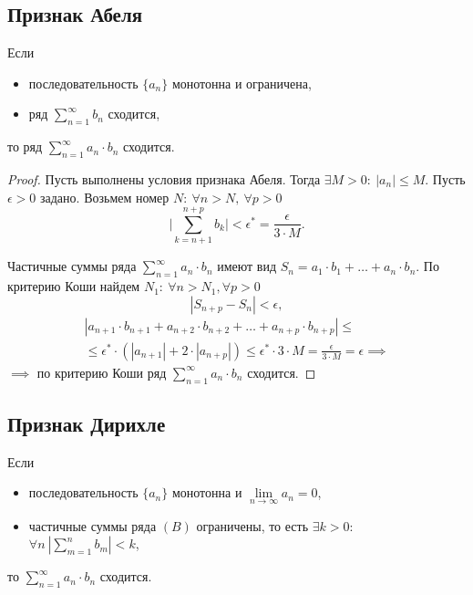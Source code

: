 \subsection{Признак Абеля}

\begin{theorem}
    Если \begin{itemize}
        \item последовательность $\{a_n\}$ монотонна и ограничена,
        \item ряд $\sum_{n=1}^{\infty} b_n$ сходится,
    \end{itemize}
    то ряд $\sum_{n=1}^{\infty}a_n \cdot b_n$ сходится.
\end{theorem}

\begin{proof}
    Пусть выполнены условия признака Абеля. Тогда $\exists M > 0: \ |a_n| \leqslant M$. Пусть $\epsilon > 0$ задано. Возьмем номер $N: \ \forall n > N, \ \forall p > 0$
    \[
        \bigg|\sum_{k=n+1}^{n+p}b_k\bigg| < \epsilon^* = \frac{\epsilon}{3\cdot M}.
    \]

    Частичные суммы ряда $\sum_{n=1}^{\infty}a_n\cdot b_n$ имеют вид $S_n = a_1\cdot b_1 + \ldots + a_n \cdot b_n$. По критерию Коши найдем $N_1: \ \forall n > N_1, \forall p > 0$
    \[
        |S_{n+p} - S_n| < \epsilon,
    \]
    \begin{multline*}
        |a_{n+1} \cdot b_{n+1} + a_{n+2} \cdot b_{n+2} + \ldots + a_{n+p} \cdot b_{n+p}| \leqslant \\
        \leqslant \epsilon^* \cdot (|a_{n+1}| + 2 \cdot |a_{n+p}|) \leqslant \epsilon^* \cdot 3 \cdot M = \frac{\epsilon}{3 \cdot M} = \epsilon \implies
    \end{multline*}
    $\implies$ по критерию Коши ряд $\sum_{n=1}^{\infty}a_n \cdot b_n$ сходится.
\end{proof}

\subsection{Признак Дирихле}

\begin{theorem}
    Если \begin{itemize}
        \item последовательность $\{a_n\}$ монотонна и $\underset{n\rightarrow\infty}{\lim}a_n = 0$,
        \item частичные суммы ряда $(B)$ ограничены, то есть $\exists k > 0: $ \\ $ \forall n \ \left|\sum_{m=1}^{n} b_m\right|< k$,
    \end{itemize}
    то $\sum_{n=1}^{\infty}a_n \cdot b_n$ сходится.
\end{theorem}

